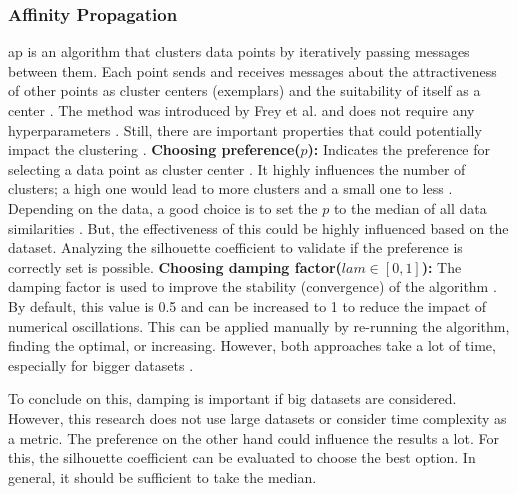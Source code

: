 \subsubsection{Affinity Propagation} \label{theory:clustering-ap}
\gls{ap} is an algorithm that clusters data points by iteratively passing messages between them.
Each point sends and receives messages about the attractiveness of other points as cluster centers (exemplars) and the suitability of itself as a center \citep{keller_balancing_2021}.
The method was introduced by Frey et al. and does not require any hyperparameters \citep{frey_clustering_2007}.
Still, there are important properties that could potentially impact the clustering \citep{wang_adaptive_2007}. \newline
\textbf{Choosing preference($p$): }
Indicates the preference for selecting a data point as cluster center \citep{wang_adaptive_2007}.
It highly influences the number of clusters; a high one would lead to more clusters and a small one to less \citep{moiane_evaluation_2018}.
Depending on the data, a good choice is to set the $p$ to the median of all data similarities \citep{wang_adaptive_2007}.
But, the effectiveness of this could be highly influenced based on the dataset.
Analyzing the silhouette coefficient \citep{moiane_evaluation_2018} to validate if the preference is correctly set is possible.
\newline
\textbf{Choosing damping factor($lam \in [0,1] $):}
The damping factor is used to improve the stability (convergence) of the algorithm \citep{wang_adaptive_2007}.
By default, this value is 0.5 and can be increased to 1 to reduce the impact of numerical oscillations.
This can be applied manually by re-running the algorithm, finding the optimal, or increasing.
However, both approaches take a lot of time, especially for bigger datasets \citep{wang_adaptive_2007}. \newline

To conclude on this, damping is important if big datasets are considered.
However, this research does not use large datasets or consider time complexity as a metric.
The preference on the other hand could influence the results a lot.
For this, the silhouette coefficient can be evaluated to choose the best option.
In general, it should be sufficient to take the median.
